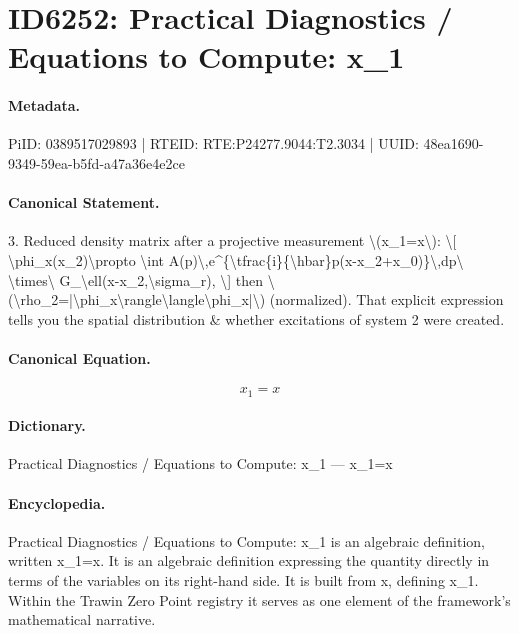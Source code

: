 \section*{ID6252: Practical Diagnostics / Equations to Compute: x\_1}
\paragraph{Metadata.}
PiID: 0389517029893 | RTEID: RTE:P24277.9044:T2.3034 | UUID: 48ea1690-9349-59ea-b5fd-a47a36e4e2ce

\paragraph{Canonical Statement.}
3. Reduced density matrix after a projective measurement \textbackslash{}(x\_1=x\textbackslash{}): \textbackslash{}[ \textbackslash{}phi\_x(x\_2)\textbackslash{}propto \textbackslash{}int A(p)\textbackslash{},e\textasciicircum{}\{\textbackslash{}tfrac\{i\}\{\textbackslash{}hbar\}p(x-x\_2+x\_0)\}\textbackslash{},dp\textbackslash{} \textbackslash{}times\textbackslash{} G\_\textbackslash{}ell(x-x\_2,\textbackslash{}sigma\_r), \textbackslash{}] then \textbackslash{}(\textbackslash{}rho\_2=|\textbackslash{}phi\_x\textbackslash{}rangle\textbackslash{}langle\textbackslash{}phi\_x|\textbackslash{}) (normalized). That explicit expression tells you the spatial distribution \& whether excitations of system 2 were created.

\paragraph{Canonical Equation.}
\[
x_1=x
\]

\paragraph{Dictionary.}
Practical Diagnostics / Equations to Compute: x\_1 — x\_1=x

\paragraph{Encyclopedia.}
Practical Diagnostics / Equations to Compute: x\_1 is an algebraic definition, written x\_1=x. It is an algebraic definition expressing the quantity directly in terms of the variables on its right-hand side. It is built from x, defining x\_1. Within the Trawin Zero Point registry it serves as one element of the framework's mathematical narrative.

